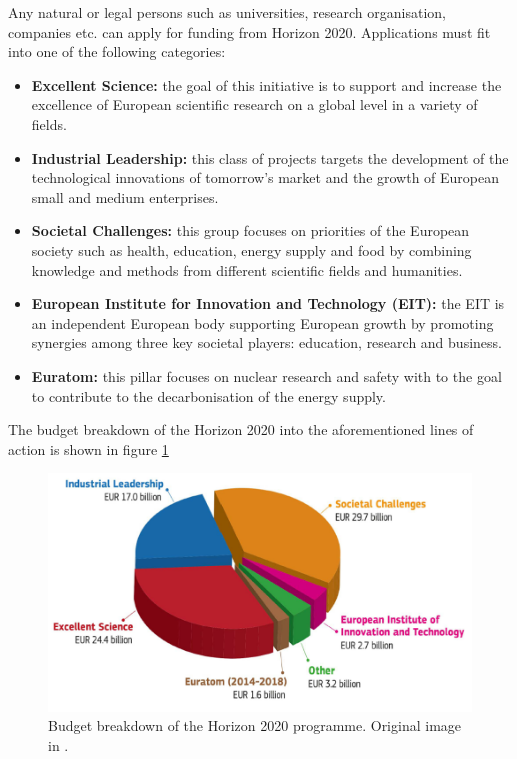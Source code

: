 
Any natural or legal persons such as universities, research organisation, companies etc. can apply for funding from Horizon 2020. Applications must fit into one of the following categories: 

\begin{itemize}
 \item \textbf{Excellent Science:} the goal of this initiative is to support and increase the excellence of European scientific research on a global level in a variety of fields.
 \item \textbf{Industrial Leadership:} this class of projects targets the development of the technological innovations of tomorrow's market and the growth of European small and medium enterprises.
 \item \textbf{Societal Challenges:} this group focuses on priorities of the European society such as health, education, energy supply and food by combining knowledge and methods from different scientific fields and humanities.  
 \item \textbf{European Institute for Innovation and Technology (EIT):} the EIT is an independent European body supporting European growth by promoting synergies among three key societal players: education, research and business. 
 \item \textbf{Euratom:} this pillar focuses on nuclear research and safety with to the goal to contribute to the decarbonisation of the energy supply.
\end{itemize}

The budget breakdown of the Horizon 2020 into the aforementioned lines of action is shown in figure \ref{H2020_budget_breakdown}

\begin{figure}[!t] 
 \begin{center}
 \includegraphics[scale=0.3]{Images/H2020_budget_breakdown.png}
 \caption{Budget breakdown of the Horizon 2020 programme. Original image in \cite{OECD}.}
 \label{H2020_budget_breakdown}
 \end{center}
\end{figure}

